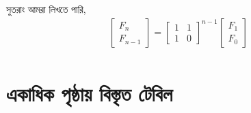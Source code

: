 সুতরাং আমরা লিখতে পারি,
\begin{align*}
\begin{bmatrix} F _n \\ F_{n-1} \end{bmatrix} = \begin{bmatrix} 1 & 1 \\ 1 & 0 \end{bmatrix}^{n-1} \begin{bmatrix} F_{1} \\ F_{0} \end{bmatrix} \\
\end{align*}


\section{একাধিক পৃষ্ঠায় বিস্তৃত টেবিল}



